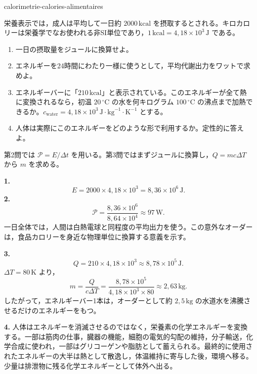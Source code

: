 \begin{exo}[食品カロリーと代謝出力]{calorimetrie-calories-alimentaires}

栄養表示では，成人は平均して一日約 $2000\,\text{kcal}$ を摂取するとされる。キロカロリーは栄養学でなお使われる非SI単位であり，$1\,\text{kcal}=4{,}18\times10^3\,\text{J}$ である。
\begin{enumerate}
  \item 一日の摂取量をジュールに換算せよ。
  \item エネルギーを24時間にわたり一様に使うとして，平均代謝出力をワットで求めよ。
  \item エネルギーバーに「$210\,\text{kcal}$」と表示されている。このエネルギーが全て熱に変換されるなら，初温 $20\,^\circ\text{C}$ の水を何キログラム $100\,^\circ\text{C}$ の沸点まで加熱できるか。$c_{\text{water}}=4{,}18\times10^3\,\text{J}\!\cdot\!\text{kg}^{-1}\!\cdot\!\text{K}^{-1}$ とする。
  \item 人体は実際にこのエネルギーをどのような形で利用するか。定性的に答えよ。
\end{enumerate}
\begin{indication}
第2問では $\mathcal P=E/\Delta t$ を用いる。第3問ではまずジュールに換算し，$Q=mc\Delta T$ から $m$ を求める。
\end{indication}
\begin{solution}
\textbf{1.}
\[
E=2000\times4{,}18\times10^3=8{,}36\times10^6\,\text{J}.
\]
\textbf{2.}
\[
\mathcal P=\frac{8{,}36\times10^6}{8{,}64\times10^4}\approx97\,\text{W}.
\]
一日全体では，人間は白熱電球と同程度の平均出力を使う。この意外なオーダーは，食品カロリーを身近な物理単位に換算する意義を示す。

\textbf{3.}
\[
Q=210\times4{,}18\times10^3\approx8{,}78\times10^5\,\text{J}.
\]
$\Delta T=80\,\text{K}$ より，
\[
m=\frac{Q}{c\Delta T}
=\frac{8{,}78\times10^5}{4{,}18\times10^3\times80}
\approx2{,}63\,\text{kg}.
\]
したがって，エネルギーバー1本は，オーダーとして約 $2{,}5\,\text{kg}$ の水道水を沸騰させるだけのエネルギーをもつ。

\textbf{4.} 人体はエネルギーを消滅させるのではなく，栄養素の化学エネルギーを変換する。一部は筋肉の仕事，臓器の機能，細胞の電気的勾配の維持，分子輸送，化学合成に使われ，一部はグリコーゲンや脂肪として蓄えられる。最終的に使用されたエネルギーの大半は熱として散逸し，体温維持に寄与した後，環境へ移る。少量は排泄物に残る化学エネルギーとして体外へ出る。
\end{solution}
\end{exo}
